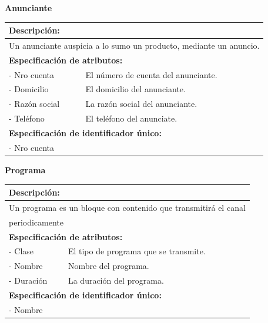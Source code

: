 \documentclass[a4paper,10pt]{article}
\begin{document}
    \begin{flushleft}
      \begin{large} \bf{Anunciante} \end{large}
    \end{flushleft}
      \begin{tabular}{| p{2cm} | p{9cm} |}
	\hline
	\multicolumn{2}{|l|}{\bf{Descripci\'on:}} \\
	\hline
	\multicolumn{2}{|l|}{Un anunciante auspicia a lo sumo un producto, mediante un anuncio.} \\
	\hline	
	\multicolumn{2}{|l|}{\bf{Especificaci\'on de atributos:}} \\
	\hline
	- Nro cuenta & El n\'umero de cuenta del anunciante. \\
	\hline \hline
	- Domicilio & El domicilio del anunciante. \\
	\hline \hline
	- Raz\'on \newline social & La raz\'on social del anunciante. \\
	\hline \hline
	- Tel\'efono & El tel\'efono del anunciate. \\
	\hline
	\multicolumn{2}{|l|}{\bf{Especificaci\'on de identificador \'unico:}} \\
	\hline
	\multicolumn{2}{|l|}{- Nro cuenta} \\
	\hline
      \end{tabular}
  \begin{flushleft}
      \begin{large} \bf{Programa} \end{large}
    \end{flushleft}
      \begin{tabular}{| p{2cm} | p{9cm} |}
	\hline
	\multicolumn{2}{|l|}{\bf{Descripci\'on:}} \\
	\hline
	\multicolumn{2}{|l|}{Un programa es un bloque con contenido que transmitir\'a el canal} \\
	\multicolumn{2}{|l|}{periodicamente} \\
	\hline	
	\multicolumn{2}{|l|}{\bf{Especificaci\'on de atributos:}} \\
	\hline
	- Clase & El tipo de programa que se transmite. \\
	\hline \hline
	- Nombre & Nombre del programa. \\
	\hline \hline
	- Duraci\'on & La duraci\'on del programa.\\
	\hline
	\multicolumn{2}{|l|}{\bf{Especificaci\'on de identificador \'unico:}} \\
	\hline
	\multicolumn{2}{|l|}{- Nombre} \\
	\hline
      \end{tabular}
  
\end{document}
